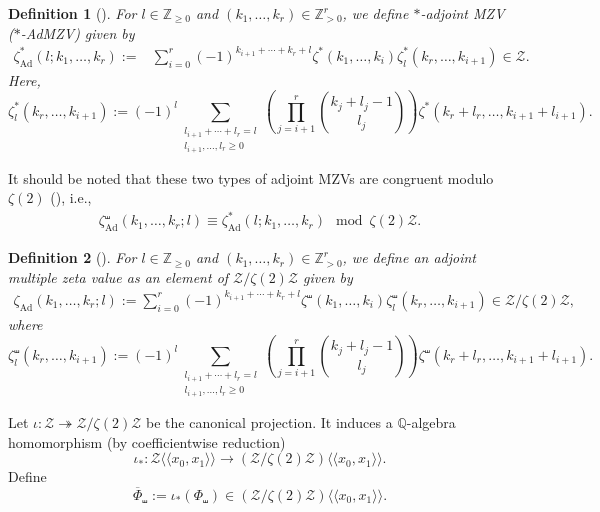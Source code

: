 \documentclass[15pt,oneside,reqno]{amsart}
\newcounter{dfcounter}
\newtheorem{df}{Definition}[dfcounter]
\theoremstyle{remark}{
\newtheorem{lem}[df]{Lemma}
\newtheorem{prop}[df]{Proposition}
\newtheorem{ex}[df]{Example}
\newtheorem{rmk}[df]{Remark}
}
\newcommand{\Q}{\mathbb{Q}}
\newcommand{\Admzv}[2]{\zeta_{\mathrm{Ad}}(#2;#1)}
\newcommand{\sAdmzv}[2]{\zeta_{\mathrm{Ad}}^{\shuffle}(#2;#1)}
\newcommand{\hAdmzv}[2]{\zeta_{\mathrm{Ad}}^{*}(#1;#2)}
\begin{document}
\begin{df}[{\cite[Definition 2.3.1]{Jarossay}}]
For $l\in\mathbb{Z}_{\ge 0}$ and $(k_1,\ldots,k_r)\in \mathbb{Z}_{>0}^r$,
we define \emph{$*$-adjoint MZV} ($*$-AdMZV) given by
\begin{align*}
\hAdmzv{l}{k_1,\ldots,k_r} :=& \sum_{i = 0}^r (-1)^{k_{i+1}+\cdots+k_r + l} \zeta^{*}(k_1,\ldots,k_i)\zeta^{*}_l(k_r,\ldots,k_{i+1}) \in \mathcal{Z}.
\end{align*}
Here, 
\[
\zeta_{l}^{*}(k_r,\ldots,k_{i+1}) := (-1)^l \sum_{\substack{l_{i+1}+\cdots+l_r = l \\ l_{i+1},\ldots,l_r\ge 0}}
\left(\prod_{j = i+1}^r \binom{k_j + l_j-1}{l_j}\right)
\zeta^{*}(k_r+l_r,\ldots,k_{i+1}+l_{i+1}).
\]
\end{df}
It should be noted that these two types of adjoint MZVs are congruent modulo $\zeta(2)$ (\cite[Proposition 3.2.4]{Jarossay}), i.e.,
\begin{align}
\sAdmzv{l}{k_1,\ldots,k_r} \equiv \hAdmzv{l}{k_1,\ldots,k_r} \mod \zeta(2)\mathcal{Z}. \label{eq:gen-AdMZV}
\end{align}
\begin{df}[{\cite[Definition 2.3.1]{Jarossay}}]\label{df:AdMZV}
For $l\in\mathbb{Z}_{\ge 0}$ and $(k_1,\ldots,k_r) \in \mathbb{Z}_{>0}^r$, we define an adjoint multiple zeta value as an element of $\mathcal{Z}/\zeta(2)\mathcal{Z}$ given by
\begin{align*}
\Admzv{l}{k_1,\ldots,k_r} := \sum_{i = 0}^r (-1)^{k_{i+1}+\cdots + k_r + l}\zeta^{\shuffle}(k_1,\ldots,k_i)\zeta_l^{\shuffle}(k_r,\ldots,k_{i+1}) \in \mathcal{Z}/\zeta(2)\mathcal{Z},
\end{align*}
where
\[
\zeta_{l}^{\shuffle}(k_r,\ldots,k_{i+1}) := (-1)^l \sum_{\substack{l_{i+1}+\cdots+l_r = l \\ l_{i+1},\ldots,l_r\ge 0}}
\left(\prod_{j = i+1}^r \binom{k_j + l_j-1}{l_j}\right)
\zeta^{\shuffle}(k_r+l_r,\ldots,k_{i+1}+l_{i+1}).
\]
\end{df}


Let $\iota:\mathcal Z \twoheadrightarrow \mathcal Z/\zeta(2)\mathcal Z$ be the canonical projection.
It induces a $\Q$-algebra homomorphism (by coefficientwise reduction)
\[
\iota_*:\mathcal Z\langle\!\langle x_0,x_1\rangle\!\rangle
\longrightarrow
(\mathcal Z/\zeta(2)\mathcal Z)\langle\!\langle x_0,x_1\rangle\!\rangle .
\]
Define
\[
\overline{\Phi}_{\shuffle}:=\iota_*(\Phi_{\shuffle})\in (\mathcal Z/\zeta(2)\mathcal Z)\langle\!\langle x_0,x_1\rangle\!\rangle .
\]
\end{document}
